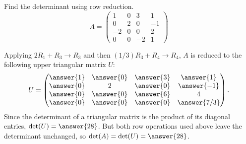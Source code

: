 \documentclass{ximera}
\author{Parisa Fatheddin}
\begin{document}
\begin{exercise}



Find the determinant using row reduction.
\[
A = \begin{pmatrix}
1 & 0 & 3 & 1\\
0 & 2 & 0 & -1 \\
-2 & 0 & 0 & 2\\
0 & 0 & -2 & 1
\end{pmatrix}
\]

\begin{prompt}
  Applying $2R_1 + R_3 \to R_3$ and then $(1/3)R_3 + R_4 \to R_4$, $A$ is
  reduced to the following upper triangular matrix $U$:
  \[
    U =
    \begin{pmatrix}
      \answer{1} & \answer{0} & \answer{3} & \answer{1}\\
      \answer{0} & 2& \answer{0} & \answer{-1}\\
      \answer{0} & \answer{0} & \answer{6} & 4\\
      \answer{0} & \answer{0} & \answer{0} & \answer{7/3}
    \end{pmatrix}.
  \]
  Since the determinant of a triangular matrix is the product of its
  diagonal entries, $\det(U) = \answer{28}$. But both row operations
  used above leave the determinant unchanged, so
  $\det(A) = \det(U) = \answer{28}$.
\end{prompt}

\end{exercise}
\end{document}
